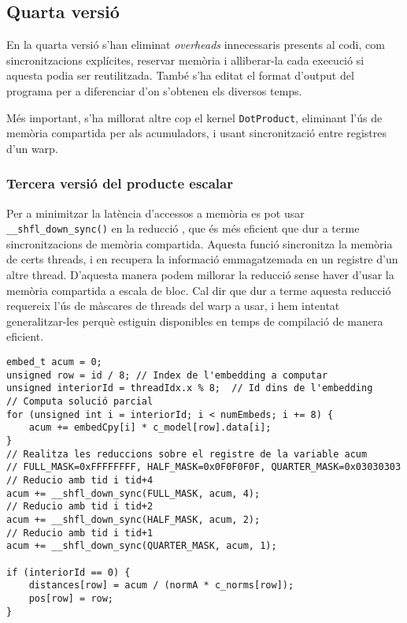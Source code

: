 \documentclass[catalan,10pt,a4paper]{article}
\begin{document}
\subsection*{Quarta versió}

En la quarta versió s'han eliminat \textit{overheads} innecessaris presents al codi, com sincronitzacions explícites, reservar memòria i alliberar-la cada execució si aquesta podia ser reutilitzada. També s'ha editat el format d'output del programa per a diferenciar d'on s'obtenen els diversos temps.

Més important, s'ha millorat altre cop el kernel \verb|DotProduct|, eliminant l'ús de memòria compartida per als acumuladors, i usant sincronització entre registres d'un warp.

\subsubsection*{Tercera versió del producte escalar}
Per a minimitzar la latència d'accessos a memòria es pot usar \verb|__shfl_down_sync()| en la reducció \cite{UsingCUD95:online}, que és més eficient que dur a terme sincronitzacions de memòria compartida. Aquesta funció sincronitza la memòria de certs threads, i en recupera la informació emmagatzemada en un registre d'un altre thread. D'aquesta manera podem millorar la reducció sense haver d'usar la memòria compartida a escala de bloc.\newline
Cal dir que dur a terme aquesta reducció requereix l'ús de màscares de threads del warp a usar, i hem intentat generalitzar-les perquè estiguin disponibles en temps de compilació de manera eficient.
\begin{verbatim}
embed_t acum = 0;
unsigned row = id / 8; // Index de l'embedding a computar
unsigned interiorId = threadIdx.x % 8;  // Id dins de l'embedding
// Computa solució parcial
for (unsigned int i = interiorId; i < numEmbeds; i += 8) {
	acum += embedCpy[i] * c_model[row].data[i]; 
}
// Realitza les reduccions sobre el registre de la variable acum
// FULL_MASK=0xFFFFFFFF, HALF_MASK=0x0F0F0F0F, QUARTER_MASK=0x03030303
// Reducio amb tid i tid+4
acum += __shfl_down_sync(FULL_MASK, acum, 4); 
// Reducio amb tid i tid+2
acum += __shfl_down_sync(HALF_MASK, acum, 2);
// Reducio amb tid i tid+1
acum += __shfl_down_sync(QUARTER_MASK, acum, 1);

if (interiorId == 0) {
	distances[row] = acum / (normA * c_norms[row]);
	pos[row] = row;
}
\end{verbatim}
\end{document}
